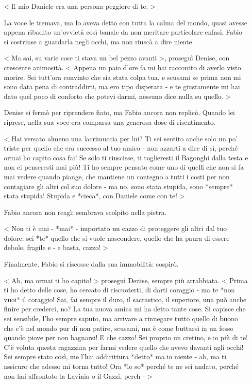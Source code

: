 < Il mio Daniele era una persona peggiore di te. >

La voce le tremava, ma lo aveva detto con tutta la calma del mondo, quasi avesse appena ribadito un'ovvietà così banale da non meritare particolare enfasi. Fabio si costrinse a guardarla negli occhi, ma non riuscà a dire niente.

< Ma sai, su varie cose ti stava un bel pezzo avanti >, proseguì Denise, con crescente animosità. < Appena un paio d'ore fa mi hai raccontto di averlo visto morire. Sei tutt'ora convinto che sia stata colpa tua, e scusami se prima non mi sono data pena di contraddirti, ma ero tipo disperata - e te giustamente mi hai dato quel poco di conforto che potevi darmi, nessuno dice nulla su quello.  >

Denise si fermò per riprendere fiato, ma Fabio ancora non replicò. Quando lei riprese, nella sua voce era comparsa una generosa dose di risentimento.

< Hai versato almeno una lacrimuccia per lui? Ti sei sentito anche solo un po' triste per quello che era successo al tuo amico - non azzarti a dire di sì, perché ormai ho capito cosa fai! Se solo ti riuscisse, ti toglieresti il Bagonghi dalla testa e non ci penseresti mai più! Ti ho sempre pensato come uno di quelli che non si fa mai vedere quando piange, che mantiene un contegno a tutti i costi per non contagiare gli altri col suo dolore - ma no, sono stata stupida, sono *sempre* stata stupida! Stupida e *cieca*, con Daniele come con te! >

Fabio ancora non reagì; sembrava scolpito nella pietra.

< Non ti è mai - *mai* - importato un cazzo di proteggere gli altri dal tuo dolore: sei *te* quello che si vuole nascondere, quello che ha paura di essere debole, fragile e - e basta, cazzo! >

Finalmente, Fabio si riscosse dalla sua immobilità: sospirò.

< Ah, ma ormai ti ho capito! > proseguì Denise, sempre più arrabbiata. < Prima ti ho detto delle cose, ho cercato di riscuoterti, di darti coraggio - ma te *non vuoi* il coraggio! Sai, fai sempre il duro, il sacrastico, il superiore, una può anche finire per crederci, no? La tua nuova amica mi ha detto tante cose. Si capisce che sei sensibile, l'ho sempre saputo, ma arrivare a rinnegare tutto quello di buono che c'è nel mondo pur di non patire, scusami, ma è come buttarsi in un fosso quando piove per non bagnarsi! E che cazzo! Sei proprio un cretino, e io più di te! C'è voluta questa ragazzina per farmi vedere quello che avevo davanti agli occhi! Sei sempre stato così, me l'hai addirittura *detto* ma io niente - ah, ma ti assicuro che adesso mi torna tutto! Ora *lo so* perché te ne sei andato, perché non hai affrontato la Lavinia o il Gazzi, perch - >


